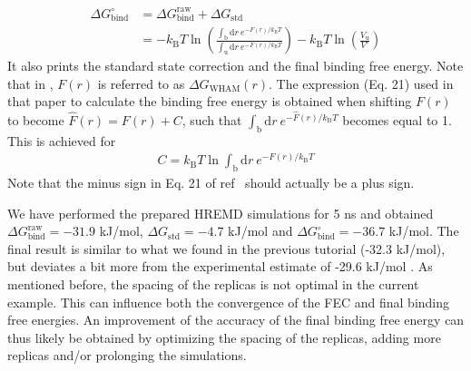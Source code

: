 \begin{equation}
  \begin{aligned}
    \Delta G_{\text{bind}}^{\circ} & = \Delta G_{\text{bind}}^{\text{raw}} + \Delta G_{\text{std}}  \\
                            & = -k_{\text{B}} T \ln \left ( \frac{\int_{\text{b}} \mathrm{d}r\: e^{-F(r)/k_{\text{B}} T}}{\int_{\text{u}} \mathrm{d}r\: e^{-F(r)/k_{\text{B}} T}} \right ) -k_{\text{B}} T \ln \left( \frac{V_{\text{u}}}{V^{\circ}} \right )
  \end{aligned}
\end{equation}
%
It also prints the standard state correction and the final binding free energy. 
Note that in \cite{deRuiter_2013}, $F(r)$ is referred to as $\Delta G_{\text{WHAM}}(r)$. The expression (Eq. 21) used in that paper to calculate the binding free energy is obtained when shifting $F(r)$ to become $\hat{F}(r) = F(r) + C$, such that $\int_{\text{b}} \mathrm{d}r\: e^{-\hat{F}(r)/k_{\text{B}} T}$ becomes equal to 1. This is achieved for 
\begin{equation}
  \begin{aligned}
    C = k_{\text{B}}T \ln \int_{\text{b}} \mathrm{d}r\: e^{-F(r)/k_{\text{B}} T}
  \end{aligned}
\end{equation}
Note that the minus sign in Eq. 21 of ref~\cite{deRuiter_2013} should actually be a plus sign.

We have performed the prepared HREMD simulations for 5 ns and obtained $\Delta G^{\text{raw}}_{\text{bind}}=-31.9$ kJ/mol, $\Delta G_{\text{std}}=-4.7$ kJ/mol and $\Delta G^{\circ}_{\text{bind}}=-36.7$ kJ/mol. The final result is similar to what we found in the previous tutorial (-32.3 kJ/mol), but deviates a bit more from the experimental estimate of -29.6 kJ/mol \cite{Singh2005}.
As mentioned before, the spacing of the replicas is not optimal in the current example. 
This can influence both the convergence of the FEC and final binding free energies.
An improvement of the accuracy of the final binding free energy can thus likely be obtained by optimizing the spacing of the replicas, adding more replicas and/or prolonging the simulations.
